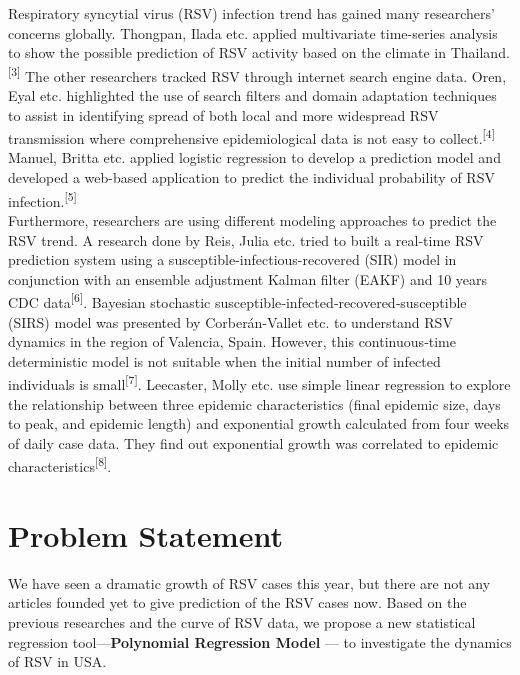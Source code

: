 \documentclass[
  letterpaper,
  DIV=11,
  numbers=noendperiod]{scrreport}
\begin{document}
Respiratory syncytial virus (RSV) infection trend has gained many
researchers' concerns globally. Thongpan, Ilada etc. applied
multivariate time-series analysis to show the possible prediction of RSV
activity based on the climate in Thailand. \textsuperscript{{[}3{]}} The
other researchers tracked RSV through internet search engine data. Oren,
Eyal etc. highlighted the use of search filters and domain adaptation
techniques to assist in identifying spread of both local and more
widespread RSV transmission where comprehensive epidemiological data is
not easy to collect.\textsuperscript{{[}4{]}} Manuel, Britta etc.
applied logistic regression to develop a prediction model and developed
a web-based application to predict the individual probability of RSV
infection.\textsuperscript{{[}5{]}}\\
Furthermore, researchers are using different modeling approaches to
predict the RSV trend. A research done by Reis, Julia etc. tried to
built a real-time RSV prediction system using a
susceptible-infectious-recovered (SIR) model in conjunction with an
ensemble adjustment Kalman filter (EAKF) and 10 years CDC
data\textsuperscript{{[}6{]}}. Bayesian stochastic
susceptible‐infected‐recovered‐susceptible (SIRS) model was presented by
Corberán-Vallet etc. to understand RSV dynamics in the region of
Valencia, Spain. However, this continuous‐time deterministic model is
not suitable when the initial number of infected individuals is
small\textsuperscript{{[}7{]}}. Leecaster, Molly etc. use simple linear
regression to explore the relationship between three epidemic
characteristics (final epidemic size, days to peak, and epidemic length)
and exponential growth calculated from four weeks of daily case data.
They find out exponential growth was correlated to epidemic
characteristics\textsuperscript{{[}8{]}}.

\hypertarget{problem-statement}{%
\section{Problem Statement}\label{problem-statement}}

We have seen a dramatic growth of RSV cases this year, but there are not
any articles founded yet to give prediction of the RSV cases now. Based
on the previous researches and the curve of RSV data, we propose a new
statistical regression tool---\textbf{Polynomial Regression Model} ---
to investigate the dynamics of RSV in USA.

\end{document}
